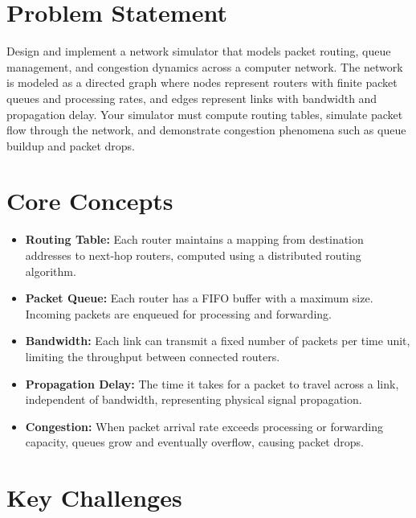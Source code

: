 \section{Problem Statement}

Design and implement a network simulator that models packet routing, queue management, and congestion dynamics across a computer network. The network is modeled as a directed graph where nodes represent routers with finite packet queues and processing rates, and edges represent links with bandwidth and propagation delay. Your simulator must compute routing tables, simulate packet flow through the network, and demonstrate congestion phenomena such as queue buildup and packet drops.

\section{Core Concepts}

\begin{itemize}
  \item \textbf{Routing Table:} Each router maintains a mapping from destination addresses to next-hop routers, computed using a distributed routing algorithm.
  \item \textbf{Packet Queue:} Each router has a FIFO buffer with a maximum size. Incoming packets are enqueued for processing and forwarding.
  \item \textbf{Bandwidth:} Each link can transmit a fixed number of packets per time unit, limiting the throughput between connected routers.
  \item \textbf{Propagation Delay:} The time it takes for a packet to travel across a link, independent of bandwidth, representing physical signal propagation.
  \item \textbf{Congestion:} When packet arrival rate exceeds processing or forwarding capacity, queues grow and eventually overflow, causing packet drops.
\end{itemize}

\section{Key Challenges}


